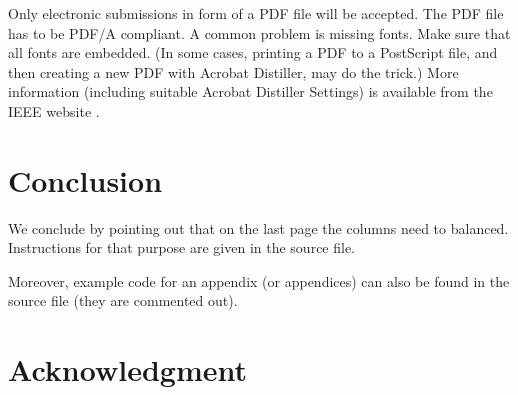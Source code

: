 \documentclass[conference,letterpaper]{IEEEtran}
\begin{document}
Only electronic submissions in form of a PDF file will be
accepted. The PDF file has to be PDF/A compliant. A common problem is
missing fonts. Make sure that all fonts are embedded. (In some cases,
printing a PDF to a PostScript file, and then creating a new PDF with
Acrobat Distiller, may do the trick.) More information (including
suitable Acrobat Distiller Settings) is available from the IEEE
website \cite{IEEE:pdfsettings, IEEE:AuthorToolbox}.


\section{Conclusion}\label{sec:con}

We conclude by pointing out that on the last page the columns need to
balanced. Instructions for that purpose are given in the source file.

Moreover, example code for an appendix (or appendices) can also be
found in the source file (they are commented out).



\section*{Acknowledgment}





%
%




\end{document}
